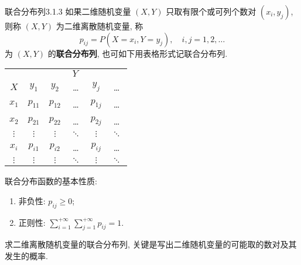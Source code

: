    \begin{definition}{联合分布列}{3.1.3}
		如果二维随机变量 $(X,Y)$ 只取有限个或可列个数对 $(x_i,y_j)$, 则称 $(X,Y)$ 为二维离散随机变量, 称
    \begin{equation}\label{eq:3.1.2}
     	p_{i j}=P\left(X=x_{i}, Y=y_{j}\right), \quad i, j=1,2, \ldots
    \end{equation}
   	为 $(X,Y)$ 的\textbf{联合分布列}, 也可如下用表格形式记联合分布列.
   \end{definition}
   \begin{center}
   		\begin{tabular}{cccccc}
   		\toprule
   		 & \multicolumn{5}{c}{$Y$} \\
   		 \cmidrule{2-6} 
   		 $X$	&	$y_1$&	$y_2$&	\ldots&	$y_j$& \ldots	\\
   		 \midrule 
   		 $x_1$& $p_{11}$ & $p_{12}$ & \ldots & $p_{1j}$ & \ldots \\
   		 \midrule 
   		 $x_2$& $p_{21}$ & $p_{22}$ & \ldots & $p_{2j}$ & \ldots \\
   		 \midrule 
   		 $\vdots$& $\vdots$ & $\vdots$ & $\ddots$ & $\vdots$ & $\ddots$ \\
   		 \midrule 
   		$x_i$ & $p_{i1}$ & $p_{i2}$ & \ldots & $p_{ij}$  & \ldots \\
   		\midrule 
   		 $\vdots$& $\vdots$ & $\vdots$ & $\ddots$ & $\vdots$ & $\ddots$ \\
   		 \bottomrule
   		\end{tabular} 
   \end{center}
   联合分布函数的基本性质:
   \begin{enumerate}
   	\item 非负性: $p_{ij}\geq 0$;
   	\item 正则性: $\sum_{i=1}^{+\infty}\sum_{j=1}^{+\infty}p_{ij}=1$.
   \end{enumerate}
   求二维离散随机变量的联合分布列, 关键是写出二维随机变量的可能取的数对及其发生的概率.


